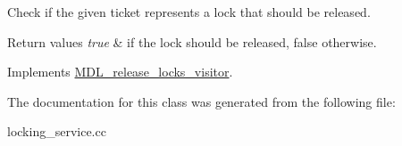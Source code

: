 Check if the given ticket represents a lock that should be released.


\begin{DoxyRetVals}{Return values}
{\em true} & if the lock should be released, false otherwise. \\
\hline
\end{DoxyRetVals}


Implements \mbox{\hyperlink{classMDL__release__locks__visitor_a2d71ff221e448ea473b5994d0d52df20}{M\+D\+L\+\_\+release\+\_\+locks\+\_\+visitor}}.



The documentation for this class was generated from the following file\+:\begin{DoxyCompactItemize}
\item 
locking\+\_\+service.\+cc\end{DoxyCompactItemize}
